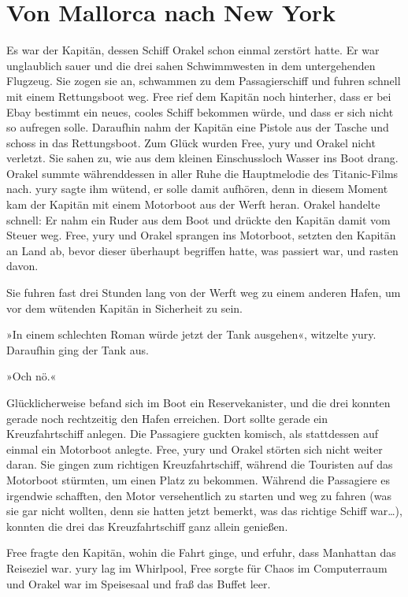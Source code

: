 \chapter{Von Mallorca nach New York}

Es war der Kapitän, dessen Schiff Orakel schon einmal zerstört hatte. Er war unglaublich sauer und die drei sahen Schwimmwesten in dem untergehenden Flugzeug. Sie zogen sie an, schwammen zu dem Passagierschiff und fuhren schnell mit einem Rettungsboot weg. Free rief dem Kapitän noch hinterher, dass er bei Ebay bestimmt ein neues, cooles Schiff bekommen würde, und dass er sich nicht so aufregen solle. Daraufhin nahm der Kapitän eine Pistole aus der Tasche und schoss in das Rettungsboot. Zum Glück wurden Free, yury und Orakel nicht verletzt. Sie sahen zu, wie aus dem kleinen Einschussloch Wasser ins Boot drang. Orakel summte währenddessen in aller Ruhe die Hauptmelodie des Titanic-Films nach. yury sagte ihm wütend, er solle damit aufhören, denn in diesem Moment kam der Kapitän mit einem Motorboot aus der Werft heran. Orakel handelte schnell: Er nahm ein Ruder aus dem Boot und drückte den Kapitän damit vom Steuer weg. Free, yury und Orakel sprangen ins Motorboot, setzten den Kapitän an Land ab, bevor dieser überhaupt begriffen hatte, was passiert war, und rasten davon.

Sie fuhren fast drei Stunden lang von der Werft weg zu einem anderen Hafen, um vor dem wütenden Kapitän in Sicherheit zu sein.

»In einem schlechten Roman würde jetzt der Tank ausgehen«, witzelte yury. Daraufhin ging der Tank aus.

»Och nö.«

Glücklicherweise befand sich im Boot ein Reservekanister, und die drei konnten gerade noch rechtzeitig den Hafen erreichen. Dort sollte gerade ein Kreuzfahrtschiff anlegen. Die Passagiere guckten komisch, als stattdessen auf einmal ein Motorboot anlegte. Free, yury und Orakel störten sich nicht weiter daran. Sie gingen zum richtigen Kreuzfahrtschiff, während die Touristen auf das Motorboot stürmten, um einen Platz zu bekommen. Während die Passagiere es irgendwie schafften, den Motor versehentlich zu starten und weg zu fahren (was sie gar nicht wollten, denn sie hatten jetzt bemerkt, was das richtige Schiff war…), konnten die drei das Kreuzfahrtschiff ganz allein genießen.

Free fragte den Kapitän, wohin die Fahrt ginge, und erfuhr, dass Manhattan das Reiseziel war. yury lag im Whirlpool, Free sorgte für Chaos im Computerraum und Orakel war im Speisesaal und fraß das Buffet leer.


